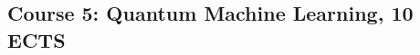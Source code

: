\documentclass{scrreprt}
\begin{document}
\begin{comment}
\textbf{Key Topics:}
\begin{itemize}
\item Quantum measurement and uncertainty: operators and observables, projective measurements vs. POVMs, uncertainty relations and their implications for measurement precision.
\item The standard quantum limit (SQL) versus the Heisenberg limit in various contexts (phase estimation, frequency estimation); quantum Fisher information and the basics of the quantum Cramér-Rao bound.
\item Squeezed states and quantum noise reduction: generation of squeezed light (optical parametric oscillators), use of squeezed vacuum in interferometers (e.g., LIGO) to improve signal-to-noise.
\item Entangled states for metrology: GHZ (Greenberger–Horne–Zeilinger) states, NOON states for interferometry, spin-squeezed states in atomic ensembles, and how these achieve sub-SQL performance.
\item Quantum sensor technologies: atomic clocks (cesium fountain clocks, optical lattice clocks), quantum magnetometers (SQUIDs, atomic magnetometers, NV-center magnetometry), quantum accelerometers and gyroscopes (atom interferometry for inertial navigation), and quantum imaging techniques (quantum illumination, ghost imaging concepts).
\item Noise and error management in sensing: effects of decoherence on sensor performance, photon loss, phase noise; introduction to error mitigation and error correction strategies in the context of metrology (e.g., using entangled states that are robust to certain noise, or feedback stabilization).
\item Case studies in quantum metrology: e.g., the role of squeezed light in gravitational wave detectors, demonstrations of entanglement-enhanced clock precision, and applications of quantum sensing in domains like biomedical imaging or geoscience.
\end{itemize}
\end{comment}
\subsection{Course 5: Quantum Machine Learning, 10 ECTS}
\end{document}
